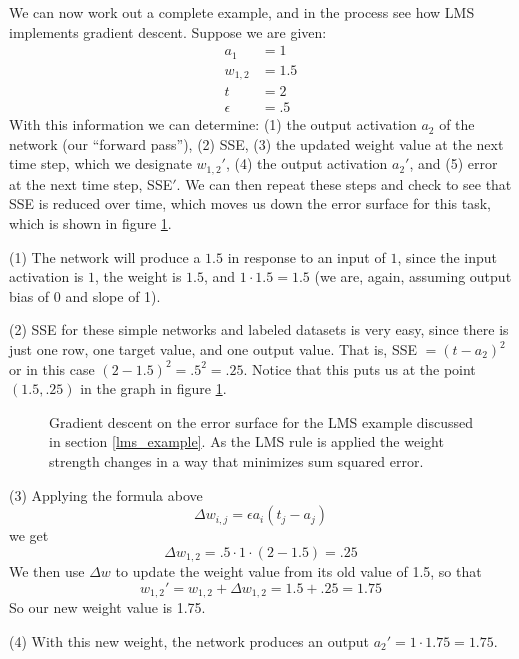 We can now work out a complete example, and in the process see how LMS implements gradient descent. Suppose we are given:
\begin{align*}
a_1 &= 1 \\
w_{1,2} &= 1.5 \\
t &= 2  \\
\epsilon &= .5
\end{align*}
With this information we can determine: (1) the output activation $a_2$ of the network (our ``forward pass''), (2) SSE, (3) the updated weight value at the next time step, which we designate $w_{1,2}'$, (4) the output activation $a_2'$, and (5) error at the next time step, SSE$'$. We can then repeat these steps and check to see that SSE is reduced over time, which moves us down the error surface for this task, which is shown in figure \ref{error_lms}.

(1) The network will produce a $1.5$ in response to an input of $1$, since the input activation is $1$, the weight is $1.5$, and $1 \cdot 1.5 = 1.5$ (we are, again, assuming output bias of 0 and slope of 1).

(2) SSE for these simple networks and labeled datasets is very easy, since there is just one row, one target value, and one output value. That is,  SSE $= (t - a_2)^2$ or in this case $(2-1.5)^2 = .5^2 = .25$. Notice that this puts us at the point $(1.5,.25)$ in the graph in figure \ref{error_lms}.

\begin{figure}[h]
\centering
{}
\caption[Jeff Yoshimi.]{Gradient descent on the error surface for the LMS example discussed in section \ref{lms_example}. As the LMS rule is applied the weight strength changes in a way that minimizes sum squared error.}
\label{error_lms}
\end{figure}

(3) Applying the formula above
\[
\Delta w_{i,j}  =  \epsilon a_i (t_j - a_j)
\]
we get
\[
\Delta w_{1,2}  =  .5 \cdot 1 \cdot (2- 1.5) = .25
\]
We then use $\Delta w$ to update the weight value from its old value of 1.5, so that
\[
w_{1,2}' = w_{1,2} + \Delta w_{1,2}  = 1.5 +.25  = 1.75
\]
So our new weight value is 1.75.

(4) With this new weight, the network produces an output  $a_2' = 1 \cdot 1.75 = 1.75$.

